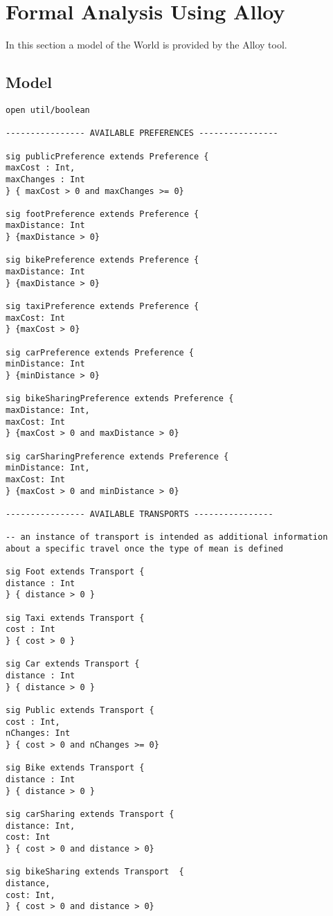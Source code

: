 \section{Formal Analysis Using Alloy}
In this section a model of the World is provided by the Alloy tool.
\subsection{Model}

\begin{lstlisting}[language=alloy]
open util/boolean

---------------- AVAILABLE PREFERENCES ----------------

sig publicPreference extends Preference {
maxCost : Int,
maxChanges : Int
} { maxCost > 0 and maxChanges >= 0}

sig footPreference extends Preference {
maxDistance: Int
} {maxDistance > 0}

sig bikePreference extends Preference {
maxDistance: Int
} {maxDistance > 0}

sig taxiPreference extends Preference {
maxCost: Int
} {maxCost > 0}

sig carPreference extends Preference {
minDistance: Int
} {minDistance > 0}

sig bikeSharingPreference extends Preference {
maxDistance: Int,
maxCost: Int
} {maxCost > 0 and maxDistance > 0}

sig carSharingPreference extends Preference {
minDistance: Int,
maxCost: Int
} {maxCost > 0 and minDistance > 0}

---------------- AVAILABLE TRANSPORTS ----------------

-- an instance of transport is intended as additional information about a specific travel once the type of mean is defined

sig Foot extends Transport {
distance : Int
} { distance > 0 }

sig Taxi extends Transport {
cost : Int
} { cost > 0 }

sig Car extends Transport {
distance : Int
} { distance > 0 }

sig Public extends Transport {
cost : Int,
nChanges: Int
} { cost > 0 and nChanges >= 0}

sig Bike extends Transport {
distance : Int
} { distance > 0 }

sig carSharing extends Transport {
distance: Int,
cost: Int
} { cost > 0 and distance > 0}

sig bikeSharing extends Transport  {
distance,
cost: Int,
} { cost > 0 and distance > 0}


\end{lstlisting}
